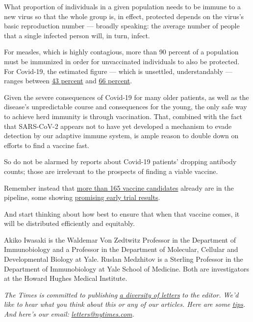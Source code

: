 What proportion of individuals in a given population needs to be immune
to a new virus so that the whole group is, in effect, protected depends
on the virus's basic reproduction number --- broadly speaking: the
average number of people that a single infected person will, in turn,
infect.

For measles, which is highly contagious, more than 90 percent of a
population must be immunized in order for unvaccinated individuals to
also be protected. For Covid-19, the estimated figure --- which is
unsettled, understandably --- ranges between
\href{https://science.sciencemag.org/content/early/2020/06/22/science.abc6810}{43
percent} and
\href{https://science.sciencemag.org/content/369/6500/208?ijkey=805a30207015dd1c16dd7b169019e0de4f8b8fc4\&keytype2=tf_ipsecsha}{66
percent}.

Given the severe consequences of Covid-19 for many older patients, as
well as the disease's unpredictable course and consequences for the
young, the only safe way to achieve herd immunity is through
vaccination. That, combined with the fact that SARS-CoV-2 appears not to
have yet developed a mechanism to evade detection by our adaptive immune
system, is ample reason to double down on efforts to find a vaccine
fast.

So do not be alarmed by reports about Covid-19 patients' dropping
antibody counts; those are irrelevant to the prospects of finding a
viable vaccine.

Remember instead that
\href{https://www.nytimes.com/interactive/2020/science/coronavirus-vaccine-tracker.html}{more
than 165 vaccine candidates} already are in the pipeline, some showing
\href{https://www.nytimes.com/2020/07/20/world/covid-coronavirus-vaccine.html}{promising
early trial results}.

And start thinking about how best to ensure that when that vaccine
comes, it will be distributed efficiently and equitably.

Akiko Iwasaki is the Waldemar Von Zedtwitz Professor in the Department
of Immunobiology and a Professor in the Department of Molecular,
Cellular and Developmental Biology at Yale. Ruslan Medzhitov is a
Sterling Professor in the Department of Immunobiology at Yale School of
Medicine. Both are investigators at the Howard Hughes Medical Institute.

\emph{The Times is committed to publishing}
\href{https://www.nytimes.com/2019/01/31/opinion/letters/letters-to-editor-new-york-times-women.html}{\emph{a
diversity of letters}} \emph{to the editor. We'd like to hear what you
think about this or any of our articles. Here are some}
\href{https://help.nytimes.com/hc/en-us/articles/115014925288-How-to-submit-a-letter-to-the-editor}{\emph{tips}}\emph{.
And here's our email:}
\href{mailto:letters@nytimes.com}{\emph{letters@nytimes.com}}\emph{.}

